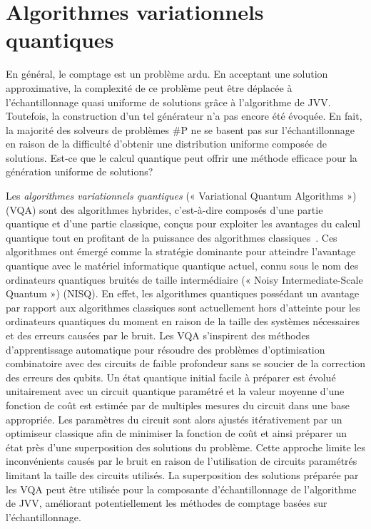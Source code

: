 \chapter{Algorithmes variationnels quantiques}
\label{cha:algorithmes-variationnels-quantiques}

En général, le comptage est un problème ardu. En acceptant une solution approximative, la complexité de ce problème peut être déplacée à l'échantillonnage quasi uniforme de solutions grâce à l'algorithme de JVV. Toutefois, la construction d'un tel générateur n'a pas encore été évoquée. En fait, la majorité des solveurs de problèmes \textsf{\#P} ne se basent pas sur l'échantillonnage en raison de la difficulté d'obtenir une distribution uniforme composée de solutions. Est-ce que le calcul quantique peut offrir une méthode efficace pour la génération uniforme de solutions?

Les \textit{algorithmes variationnels quantiques} (« Variational Quantum Algorithms ») (VQA) sont des algorithmes hybrides, c'est-à-dire composés d'une partie quantique et d'une partie classique, conçus pour exploiter les avantages du calcul quantique tout en profitant de la puissance des algorithmes classiques~\cite{cerezoVariationalQuantumAlgorithms2021}. Ces algorithmes ont émergé comme la stratégie dominante pour atteindre l'avantage quantique avec le matériel informatique quantique actuel, connu sous le nom des ordinateurs quantiques bruités de taille intermédiaire (« Noisy Intermediate-Scale Quantum ») (NISQ). En effet, les algorithmes quantiques possédant un avantage par rapport aux algorithmes classiques sont actuellement hors d'atteinte pour les ordinateurs quantiques du moment en raison de la taille des systèmes nécessaires et des erreurs causées par le bruit. Les VQA s'inspirent des méthodes d'apprentissage automatique pour résoudre des problèmes d'optimisation combinatoire avec des circuits de faible profondeur sans se soucier de la correction des erreurs des qubits. Un état quantique initial facile à préparer est évolué unitairement avec un circuit quantique paramétré et la valeur moyenne d'une fonction de coût est estimée par de multiples mesures du circuit dans une base appropriée. Les paramètres du circuit sont alors ajustés itérativement par un optimiseur classique afin de minimiser la fonction de coût et ainsi préparer un état près d'une superposition des solutions du problème. Cette approche limite les inconvénients causés par le bruit en raison de l'utilisation de circuits paramétrés limitant la taille des circuits utilisés. La superposition des solutions préparée par les VQA peut être utilisée pour la composante d'échantillonnage de l'algorithme de JVV, améliorant potentiellement les méthodes de comptage basées sur l'échantillonnage.

